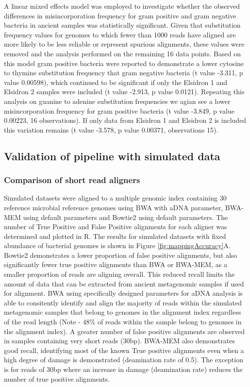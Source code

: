\documentclass[12pt, a4paper]{article}
\begin{document}
A linear mixed effects model was employed to investigate whether the observed differences in misincorporation frequency for gram positive and gram negative bacteria in ancient samples was statistically significant. 
Given that substitution frequency values for genomes to which fewer than 1000 reads have aligned are more likely to be less reliable or represent spurious alignments, these values were removed and the analysis performed on the remaining 16 data points. 
Based on this model gram positive bacteria were reported to demonstrate a lower cytosine to thymine substitution frequency that gram negative bacteria (t value -3.311, p value 0.00598), which continued to be significant if only the Elsidron 1 and Elsidron 2 samples were included (t value -2.913, p value 0.0121).
Repeating this analysis on guanine to adenine substitution frequencies we agian see a lower misincorporation frequency for gram positive bacteria (t value -3.849, p value 0.00223, 16 observations).
If only data from Elsidron 1 and Elsidron 2 is included this variation remains (t value -3.578, p value 0.00371, observations 15).

\clearpage
\subsection{Validation of pipeline with simulated data}

\subsubsection{Comparison of short read aligners}
Simulated datasets were aligned to a multiple genomic index containing 30 reference microbial reference genomes using BWA with aDNA parameter, BWA-MEM using default parameters and Bowtie2 using default parameters. 
The number of True Positive and False Positive alignments for each aligner was determined and plotted in R. 
The results for simulated datasets with fixed abundance of bacterial genomes is shown in Figure \ref{fig:mappingAccuracy}A. 
Bowtie2 demonstrates a lower proportion of false positive alignments, but also significantly fewer true positive alignments than BWA or BWA-MEM, as a smaller proportion of reads are aligning overall. 
This reduced recall limits the amount of data that can be extracted from ancient metagenomic samples if used for alignment. BWA using specifically designed parameters for aDNA analysis is able to consitently identify and align the majority of reads within the simulated metagenomic samples that belong to genomes in the alignment index regardless of the read length (Note - 48\% of reads within the sample belong to genomes in the alignment index). A greater number of false positive alignments are observed in samples containing very short reads (30bp). 
BWA-MEM also demonstrates good recall, identifying most of the known True positive alignments even when a high degree of damage is demonstrated (deamination rate of 0.5). 
The exception is for reads of 30bp where an increase in damage (deamination rate) reduces the number of true positive alignments. 
\end{document}
